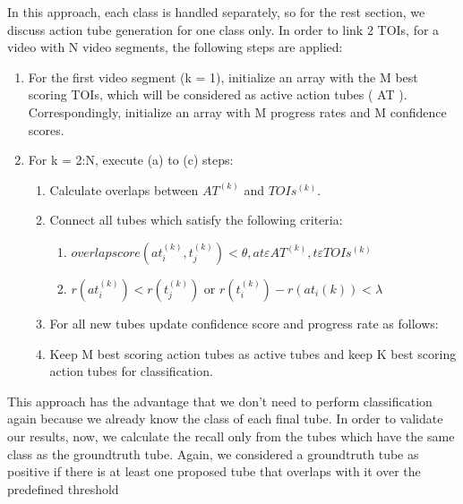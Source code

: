 In this approach, each class is handled separately, so for the rest section, we discuss action tube generation for one class only. In order to link 2 TOIs, for
a video with N video segments, the following steps are applied:
\begin{enumerate}
\item For the first video segment (k = 1), initialize an array with the M best scoring TOIs, which will be considered as active action tubes ( AT ).
  Correspondingly, initialize an array with M progress rates  and M confidence scores.
\item For k = 2:N, execute (a) to (c) steps:
  \begin{enumerate}
  \item Calculate overlaps between $ AT^{(k)} $ and $ TOIs^{(k)}. $
  \item Connect all tubes which satisfy the following criteria:
    \begin{enumerate}
    \item $ overlap score(at_i^{(k)},t_j^{(k)})   < \theta, 
      at  \varepsilon AT^{(k)}, t \varepsilon TOIs^{(k)}  $
    \item $r(at_i^{(k)}) < r(t_j^{(k)}) $ or 
      $r(t_i^{(k)}) - r(at_i{(k)}) < \lambda $
    \end{enumerate}
    
  \item For all new tubes update confidence score and progress rate as follows:
  \item Keep M best scoring action tubes as active tubes and keep K best scoring action tubes for classification.
  \end{enumerate}
  
\end{enumerate}

This approach has the advantage that we don't need to perform classification again because we already know the class of
each final tube. In order to validate our results, now, we calculate the recall only from the tubes which have the same
class as the groundtruth tube. Again, we considered a groundtruth  tube as positive if there is at least one proposed  tube
that overlaps with it over the predefined threshold

